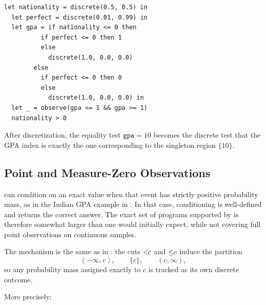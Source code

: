 \begin{lstlisting}[aboveskip=1em,belowskip=1em]
  let nationality = discrete(0.5, 0.5) in
  let perfect = discrete(0.01, 0.99) in
  let gpa = if nationality <= 0 then
          if perfect <= 0 then 1
          else
            discrete(1.0, 0.0, 0.0)
        else
          if perfect <= 0 then 0
          else
            discrete(1.0, 0.0, 0.0) in
  let _ = observe(gpa <= 1 && gpa >= 1)
  nationality > 0
\end{lstlisting}

\noindent
After discretization, the equality test $\texttt{gpa} = 10$ becomes the discrete test that the GPA index is exactly the one corresponding to the singleton region $\{10\}$. 

\subsection{Point and Measure-Zero Observations}\label{ap:measure-zero-observations}

\Slice{} can condition on an exact value when that event has strictly positive probability mass, as in the Indian GPA example in . In that case, conditioning is well-defined and \Slice{} returns the correct answer. The exact set of programs supported by \Slice{} is therefore somewhat larger than one would initially expect, while not covering full point observations on continuous samples.

The mechanism is the same as in : the cuts $<\!\!{c}$ and $\leq\!\!{c}$ induce the partition
\[
(-\infty,c), \qquad \{c\}, \qquad (c,\infty),
\]
so any probability mass assigned exactly to $c$ is tracked as its own discrete outcome.

More precisely:

